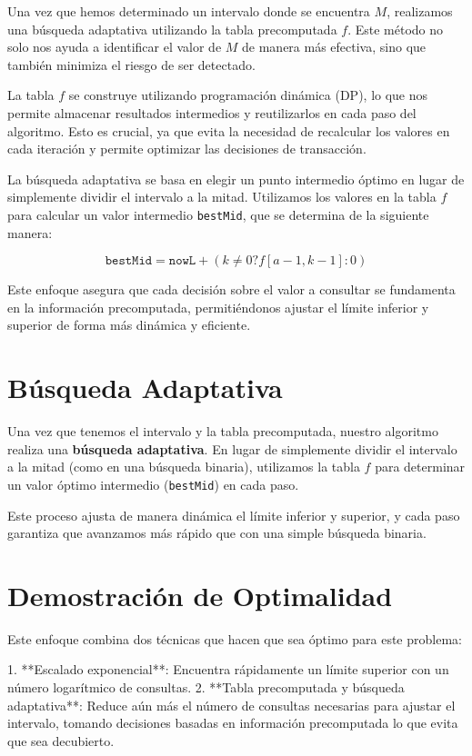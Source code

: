 \documentclass{article}
\begin{document}
Una vez que hemos determinado un intervalo donde se encuentra \(M\), realizamos una búsqueda adaptativa utilizando la tabla precomputada \(f\). Este método no solo nos ayuda a identificar el valor de \(M\) de manera más efectiva, sino que también minimiza el riesgo de ser detectado.

La tabla \(f\) se construye utilizando programación dinámica (DP), lo que nos permite almacenar resultados intermedios y reutilizarlos en cada paso del algoritmo. Esto es crucial, ya que evita la necesidad de recalcular los valores en cada iteración y permite optimizar las decisiones de transacción.

La búsqueda adaptativa se basa en elegir un punto intermedio óptimo en lugar de simplemente dividir el intervalo a la mitad. Utilizamos los valores en la tabla \(f\) para calcular un valor intermedio \texttt{bestMid}, que se determina de la siguiente manera:

\[
\texttt{bestMid} = \texttt{nowL} + (k \neq 0 ? f[a - 1, k - 1] : 0)
\]

Este enfoque asegura que cada decisión sobre el valor a consultar se fundamenta en la información precomputada, permitiéndonos ajustar el límite inferior y superior de forma más dinámica y eficiente.

\section{Búsqueda Adaptativa}

Una vez que tenemos el intervalo y la tabla precomputada, nuestro algoritmo realiza una \textbf{búsqueda adaptativa}. En lugar de simplemente dividir el intervalo a la mitad (como en una búsqueda binaria), utilizamos la tabla $f$ para determinar un valor óptimo intermedio (\texttt{bestMid}) en cada paso.

Este proceso ajusta de manera dinámica el límite inferior y superior, y cada paso garantiza que avanzamos más rápido que con una simple búsqueda binaria.

\section{Demostración de Optimalidad}

Este enfoque combina dos técnicas que hacen que sea óptimo para este problema:

1. **Escalado exponencial**: Encuentra rápidamente un límite superior con un número logarítmico de consultas.
2. **Tabla precomputada y búsqueda adaptativa**: Reduce aún más el número de consultas necesarias para ajustar el intervalo, tomando decisiones basadas en información precomputada lo que evita que sea decubierto.
\end{document}
